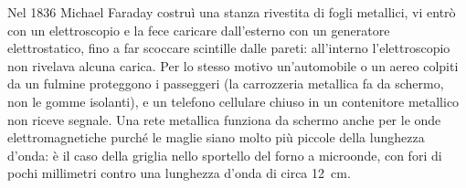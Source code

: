\begin{Es}
  Nel 1836 Michael Faraday costruì una stanza rivestita di fogli metallici, vi entrò con un elettroscopio e la fece caricare dall'esterno con un generatore elettrostatico, fino a far scoccare scintille dalle pareti: all'interno l'elettroscopio non rivelava alcuna carica. Per lo stesso motivo un'automobile o un aereo colpiti da un fulmine proteggono i passeggeri (la carrozzeria metallica fa da schermo, non le gomme isolanti), e un telefono cellulare chiuso in un contenitore metallico non riceve segnale. Una rete metallica funziona da schermo anche per le onde elettromagnetiche purché le maglie siano molto più piccole della lunghezza d'onda: è il caso della griglia nello sportello del forno a microonde, con fori di pochi millimetri contro una lunghezza d'onda di circa \SI{12}{\centi\meter}.
\end{Es}
